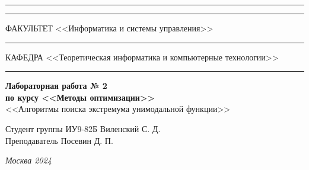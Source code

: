 \documentclass[a4paper, 14pt]{extarticle}
\begin{document}
\begin{titlepage}
\vspace{-25pt}
\hspace{-35pt}\rule{\textwidth}{2.3pt}

\vspace*{-20.3pt}
\hspace{-35pt}\rule{\textwidth}{0.4pt}

\vspace{1.5ex}
\hspace{-35pt} \noindent \small ФАКУЛЬТЕТ\hspace{80pt} <<Информатика и системы управления>>

\vspace*{-16pt}
\hspace{47pt}\rule{0.83\textwidth}{0.4pt}

\vspace{0.5ex}
\hspace{-35pt} \noindent \small КАФЕДРА\hspace{50pt} <<Теоретическая информатика и компьютерные технологии>>

\vspace*{-16pt}
\hspace{30pt}\rule{0.866\textwidth}{0.4pt}
  
\vspace{11em}

\begin{center}
\Large {\bf Лабораторная работа № 2} \\ 
\large {\bf по курсу <<Методы оптимизации>>} \\
\large <<Алгоритмы поиска экстремума унимодальной функции>> 
\end{center}\normalsize

\vspace{8em}


\begin{flushright}
  {Студент группы ИУ9-82Б Виленский С. Д. \hspace*{15pt}\\ 
  \vspace{2ex}
  Преподаватель Посевин Д. П.\hspace*{15pt}}
\end{flushright}

\bigskip

\vfill
 

\begin{center}
\textsl{Москва 2024}
\end{center}
\end{titlepage}
\end{document}
